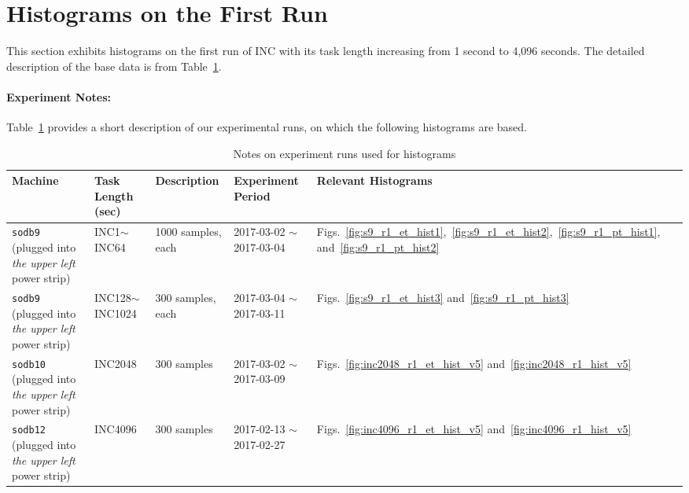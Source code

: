 \section{Histograms on the First Run~\label{sec:first_run}} 
This section exhibits histograms on the first run of 
INC with its task length increasing from 1 second to 4,096 seconds. 
The detailed description of the base data is from Table~\ref{tab:exp_notes1}.

\paragraph{Experiment Notes:}
Table~\ref{tab:exp_notes1} provides a short description of our experimental runs, 
on which the following histograms are based.

\begin{table}[h]
\begin{center}
\begin{tabular}{|p{3cm}|p{2cm}|p{3cm}|p{4cm}|p{3cm}|} \hline
Machine & Task Length (sec) & Description & Experiment Period & Relevant \linebreak Histograms\\ \hline
{\tt sodb9} (plugged into {\em the upper left} power strip)  &  INC1$\sim$INC64 & 1000 samples, each & 2017-03-02 $\sim$ 2017-03-04 & Figs.~\ref{fig:s9_r1_et_hist1},~\ref{fig:s9_r1_et_hist2},~\ref{fig:s9_r1_pt_hist1}, and~\ref{fig:s9_r1_pt_hist2}\\ \hline
{\tt sodb9} (plugged into {\em the upper left} power strip)  &  INC128$\sim$ INC1024 & 300 samples, each & 2017-03-04 $\sim$ 2017-03-11 & 
Figs.~\ref{fig:s9_r1_et_hist3} and~\ref{fig:s9_r1_pt_hist3}\\ \hline
{\tt sodb10} (plugged into {\em the upper left} power strip)  & INC2048 & 300 samples & 2017-03-02 $\sim$ 2017-03-09 & Figs.~\ref{fig:inc2048_r1_et_hist_v5} and~\ref{fig:inc2048_r1_hist_v5}\\ \hline
{\tt sodb12} (plugged into {\em the upper left} power strip)  & INC4096 & 300 samples & 2017-02-13 $\sim$ 2017-02-27 & Figs.~\ref{fig:inc4096_r1_et_hist_v5} and~\ref{fig:inc4096_r1_hist_v5}\\ \hline
\end{tabular}
\end{center}
\vspace{-.2in}
\caption{Notes on experiment runs used for histograms\label{tab:exp_notes1}}
\end{table}

